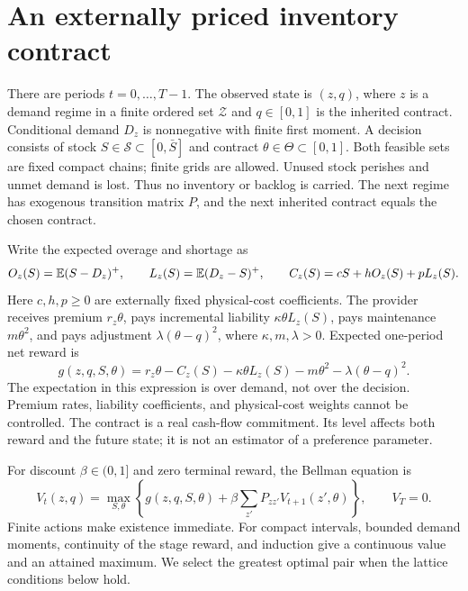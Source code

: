 \section{An externally priced inventory contract}\label{sec:model}
There are periods $t=0,\ldots,T-1$. The observed state is $(z,q)$, where $z$ is a demand regime in a finite ordered set $\mathcal Z$ and $q\in[0,1]$ is the inherited contract. Conditional demand $D_z$ is nonnegative with finite first moment. A decision consists of stock $S\in\mathcal S\subset[0,\bar S]$ and contract $\theta\in\Theta\subset[0,1]$. Both feasible sets are fixed compact chains; finite grids are allowed. Unused stock perishes and unmet demand is lost. Thus no inventory or backlog is carried. The next regime has exogenous transition matrix $P$, and the next inherited contract equals the chosen contract.

Write the expected overage and shortage as
\begin{equation}\label{eq:cost}
 O_z(S)=\mathbb E(S-D_z)^+,\qquad L_z(S)=\mathbb E(D_z-S)^+,\qquad
 C_z(S)=cS+hO_z(S)+pL_z(S).
\end{equation}
Here $c,h,p\geq0$ are externally fixed physical-cost coefficients. The provider receives premium $r_z\theta$, pays incremental liability $\kappa\theta L_z(S)$, pays maintenance $m\theta^2$, and pays adjustment $\lambda(\theta-q)^2$, where $\kappa,m,\lambda>0$. Expected one-period net reward is
\begin{equation}\label{eq:reward}
 g(z,q,S,\theta)=r_z\theta-C_z(S)-\kappa\theta L_z(S)
                       -m\theta^2-\lambda(\theta-q)^2.
\end{equation}
The expectation in this expression is over demand, not over the decision. Premium rates, liability coefficients, and physical-cost weights cannot be controlled. The contract is a real cash-flow commitment. Its level affects both reward and the future state; it is not an estimator of a preference parameter.

For discount $\beta\in(0,1]$ and zero terminal reward, the Bellman equation is
\begin{equation}\label{eq:bellman}
 V_t(z,q)=\max_{S,\theta}\left\{g(z,q,S,\theta)
       +\beta\sum_{z'}P_{zz'}V_{t+1}(z',\theta)\right\},\qquad V_T=0.
\end{equation}
Finite actions make existence immediate. For compact intervals, bounded demand moments, continuity of the stage reward, and induction give a continuous value and an attained maximum. We select the greatest optimal pair when the lattice conditions below hold.

